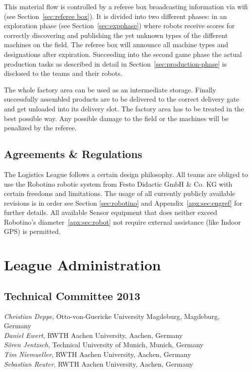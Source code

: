 \documentclass[12pt,twoside]{article}
\newcommand{\refsec}[1]{Section~\ref{#1}}
\begin{document}
This material flow is controlled by a referee box broadcasting information
via wifi (see \refsec{sec:referee box}). It is divided into two different
phases: in an exploration phase (see \refsec{sec:expphase}) where robots
receive scores for correctly discovering and publishing the yet
unknown types of the different machines on the field. The referee box will announce
all machine types and designations after expiration.
Succeeding into the second game phase the actual production
tasks as described in detail in \refsec{sec:production-phase} is disclosed to the teams and their robots.

The whole factory area can be used as an intermediate
storage. Finally successfully assembled products are to be
delivered to the correct delivery gate and get unloaded into its
delivery slot. The factory area has to be treated in the best possible
way. Any possible damage to the field or the machines will be penalized
by the referee.

\subsection{Agreements \& Regulations} \label{sec:agreements}

The Logistics League follows a certain design philosophy. All teams
are obliged to use the Robotino robotic system from Festo Didactic
GmbH \& Co. KG with certain freedoms and limitations. The usage of all
currently publicly available revisions is in order see Section
\ref{sec:robotino} and Appendix~\ref{apx:sec:engref} for further
details. All available Sensor equipment that does neither exceed Robotino's diameter~\ref{apx:sec:robot}  not require external assistance (like Indoor GPS) is permitted.




\section{League Administration} \label{sec:commitees}
\subsection{Technical Committee 2013} \label{sec:tc}
\emph{Christian Deppe}, Otto-von-Guericke University Magdeburg, Magdeburg,
Germany\\
\emph{Daniel Ewert}, RWTH Aachen University, Aachen, Germany\\
\emph{S\"oren Jentzsch}, Technical University of Munich, Munich, Germany\\
\emph{Tim Niemueller}, RWTH Aachen University, Aachen, Germany\\
\emph{Sebastian Reuter}, RWTH Aachen University, Aachen, Germany
\end{document}
